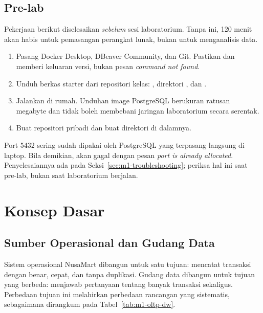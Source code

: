 \subsection{Pre-lab}

Pekerjaan berikut diselesaikan \emph{sebelum} sesi laboratorium. Tanpa ini,
120 menit akan habis untuk pemasangan perangkat lunak, bukan untuk menganalisis
data.

\begin{enumerate}[leftmargin=1.4em]
  \item Pasang Docker Desktop, DBeaver Community, dan Git. Pastikan
         dan  memberi
        keluaran versi, bukan pesan \emph{command not found}.
  \item Unduh berkas starter dari repositori kelas: ,
        direktori , dan .
  \item Jalankan  di rumah. Unduhan image
        PostgreSQL berukuran ratusan megabyte dan tidak boleh membebani jaringan
        laboratorium secara serentak.
  \item Buat repositori pribadi  dan buat direktori
         di dalamnya.
\end{enumerate}

\begin{peringatan}
Port 5432 sering sudah dipakai oleh PostgreSQL yang terpasang langsung di
laptop. Bila demikian,  akan gagal dengan pesan
\emph{port is already allocated}. Penyelesaiannya ada pada
Seksi~\ref{sec:m1-troubleshooting}; periksa hal ini saat pre-lab, bukan saat
laboratorium berjalan.
\end{peringatan}

\section{Konsep Dasar}

\subsection{Sumber Operasional dan Gudang Data}

Sistem operasional NusaMart dibangun untuk satu tujuan: mencatat transaksi
dengan benar, cepat, dan tanpa duplikasi. Gudang data dibangun untuk tujuan yang
berbeda: menjawab pertanyaan tentang banyak transaksi sekaligus. Perbedaan
tujuan ini melahirkan perbedaan rancangan yang sistematis, sebagaimana dirangkum
pada Tabel~\ref{tab:m1-oltp-dw}.

